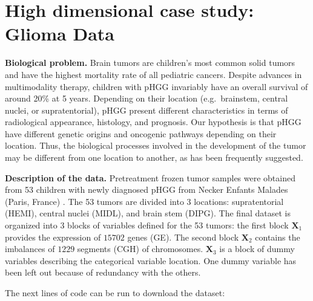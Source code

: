 \documentclass[
]{jss}
\begin{document}
\hypertarget{high-dimensional-case-study-glioma-data}{%
\section{High dimensional case study: Glioma
Data}\label{high-dimensional-case-study-glioma-data}}

\textbf{Biological problem.} Brain tumors are children's most common
solid tumors and have the highest mortality rate of all pediatric
cancers. Despite advances in multimodality therapy, children with pHGG
invariably have an overall survival of around 20\% at 5 years. Depending
on their location (e.g.~brainstem, central nuclei, or supratentorial),
pHGG present different characteristics in terms of radiological
appearance, histology, and prognosis. Our hypothesis is that pHGG have
different genetic origins and oncogenic pathways depending on their
location. Thus, the biological processes involved in the development of
the tumor may be different from one location to another, as has been
frequently suggested.

\textbf{Description of the data.} Pretreatment frozen tumor samples were
obtained from 53 children with newly diagnosed pHGG from Necker Enfants
Malades (Paris, France) \citep{Puget2012}. The 53 tumors are divided
into 3 locations: supratentorial (HEMI), central nuclei (MIDL), and
brain stem (DIPG). The final dataset is organized into 3 blocks of
variables defined for the 53 tumors: the first block \(\mathbf{X}_1\)
provides the expression of \(15702\) genes (GE). The second block
\(\mathbf{X}_2\) contains the imbalances of \(1229\) segments (CGH) of
chromosomes. \(\mathbf{X}_3\) is a block of dummy variables describing
the categorical variable location. One dummy variable has been left out
because of redundancy with the others.

The next lines of code can be run to download the dataset:

\footnotesize

\begin{CodeChunk}
\end{CodeChunk}
\end{document}
